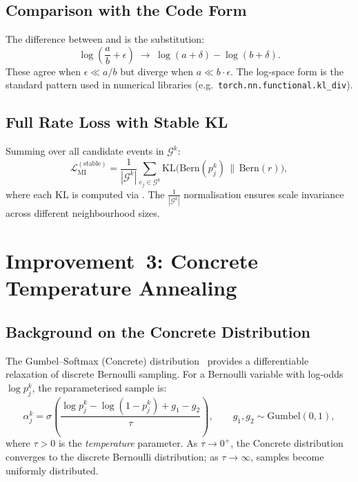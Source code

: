 \documentclass[11pt,a4paper]{article}
\newcommand{\G}{\mathcal{G}}
\newcommand{\KL}{\mathrm{KL}}
\newcommand{\Bern}{\mathrm{Bern}}
\newcommand{\loss}{\mathcal{L}}
\begin{document}
\subsection{Comparison with the Code Form}

The difference between  and  is
the substitution:
\begin{equation}
\log\!\left(\frac{a}{b} + \epsilon\right)
  \;\longrightarrow\;
\log(a + \delta) - \log(b + \delta).
\end{equation}
These agree when $\epsilon \ll a/b$ but diverge when $a \ll b \cdot
\epsilon$. The log-space form is the standard pattern used in
numerical libraries (e.g.\
\texttt{torch.nn.functional.kl\_div}).

\subsection{Full Rate Loss with Stable KL}

Summing over all candidate events in $\G^k$:
\begin{equation}
\label{eq:mi_stable}
\loss_{\text{MI}}^{(\text{stable})}
  = \frac{1}{|\G^k|}\sum_{e_j \in \G^k}
    \KL\!\big(\Bern(p_j^k) \,\|\, \Bern(r)\big),
\end{equation}
where each $\KL$ is computed via . The
$\frac{1}{|\G^k|}$ normalisation ensures scale invariance across
different neighbourhood sizes.

\section{Improvement~3: Concrete Temperature Annealing}
\label{sec:temp_anneal}

\subsection{Background on the Concrete Distribution}

The Gumbel--Softmax (Concrete) distribution~\cite{jang2016gumbel}
provides a differentiable relaxation of discrete Bernoulli sampling.
For a Bernoulli variable with log-odds $\log p_j^k$, the
reparameterised sample is:
\begin{equation}
\label{eq:concrete}
\alpha_j^k
  = \sigma\!\left(
    \frac{\log p_j^k - \log(1 - p_j^k) + g_1 - g_2}{\tau}
  \right),
  \qquad g_1, g_2 \sim \text{Gumbel}(0, 1),
\end{equation}
where $\tau > 0$ is the \emph{temperature} parameter. As
$\tau \to 0^+$, the Concrete distribution converges to the discrete
Bernoulli distribution; as $\tau \to \infty$, samples become uniformly
distributed.
\end{document}
